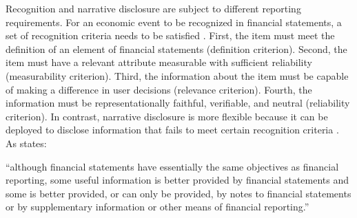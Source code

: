 \documentclass[letterpaper,12pt]{article}
\begin{document}
\begin{spacing}{1.5}
Recognition and narrative disclosure are subject to different reporting requirements. For an economic event to be recognized in financial statements, a set of recognition criteria needs to be satisfied \cite{fasbStatementFinancialAccounting1984}. First, the item must meet the definition of an element of financial statements (definition criterion). Second, the item must have a relevant attribute measurable with sufficient reliability (measurability criterion). Third, the information about the item must be capable of making a difference in user decisions (relevance criterion). Fourth, the information must be representationally faithful, verifiable, and neutral (reliability criterion). In contrast, narrative disclosure is more flexible because it can be deployed to disclose information that fails to meet certain recognition criteria \cite[par. 7b]{fasbStatementFinancialAccounting1984}. As  states:
\begin{adjustwidth}{0.8cm}{0.4cm}
	\begin{singlespace}
		``although financial statements have essentially the same objectives as financial reporting, some useful information is better provided by financial statements and some is better provided, or can only be provided, by notes to financial statements or by supplementary information or other means of financial reporting.''
	\end{singlespace}
\end{adjustwidth}


\end{spacing}
\end{document}
